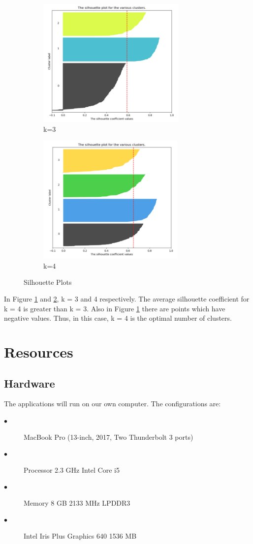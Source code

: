 \documentclass[12pt]{article}
\begin{document}
\begin{figure}[H]
\centering
	\begin{subfigure}{.5\textwidth}
 	 \centering
  	\includegraphics[height=2.5in]{spk3}
  	\caption{k=3}
 	 \label{fig:sub1}
	\end{subfigure}%
	\hfill
	\begin{subfigure}{.5\textwidth}
  	\centering
  	\includegraphics[height=2.5in]{spk4}
  	\caption{k=4}
  	\label{fig:sub2}
	\end{subfigure}
\caption{Silhouette Plots}
\label{fig:test}
\end{figure}


In Figure \ref{fig:sub1} and \ref{fig:sub2}, k = 3 and 4 respectively. The average silhouette coefficient for k = 4 is greater than k = 3. Also in Figure \ref{fig:sub1} there are points which have negative values. Thus, in this case, k = 4 is the optimal number of clusters.
\section{Resources}
\subsection{Hardware}
The applications will run on our own computer. The configurations are:
\begin{description}
\item[$\bullet$ ] MacBook Pro (13-inch, 2017, Two Thunderbolt 3 ports)
\item[$\bullet$ ]Processor 2.3 GHz Intel Core i5
\item[$\bullet$ ]Memory 8 GB 2133 MHz LPDDR3
\item[$\bullet$ ]Intel Iris Plus Graphics 640 1536 MB
\end{description}
\end{document}

